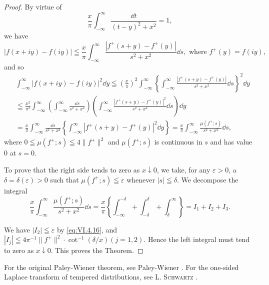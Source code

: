 \begin{proof}
By virtue of 
\begin{equation}\label{eq:VI.4.16}
\frac {x}{\pi} \int_{- \infty} ^{\infty} \frac {\dd t}{(t - y) ^{2} + x ^{2}} = 1,
\end{equation}
we have 
\[
\left| f (x + i y) - f (i y) \right| \leqq \frac {x}{\pi} \int_{- \infty} ^{\infty} \frac {\left| f ^{+} (s + y) - f ^{+} (y) \right|}{s ^{2} + x ^{2}} \dd s, \text{ where } f ^{+} (y) = f (i y),
\]
and so 
\[
\begin{aligned}
&\int_{- \infty} ^{\infty} | f (x + i y) - f (i y) | ^{2} \dd y  \leqq \left(\frac {x}{\pi}\right) ^{2} \int_{- \infty} ^{\infty} \left\{\int_{- \infty} ^{\infty} \frac {| f ^{+} (s + y) - f ^{+} (y) |}{s ^{2} + x ^{2}} \dd s \right\} ^{2} \dd y \\
&\leqq \frac {x ^{2}}{\pi^{2}} \int_{- \infty} ^{\infty} \left(\int_{- \infty} ^{\infty} \frac {\dd s}{s ^{2} + x ^{2}}\right) \left(\int_{- \infty} ^{\infty} \frac {| f ^{+} (s + y) - f ^{+} (y) | ^{2}}{s ^{2} + x ^{2}} \dd s\right) \dd y \\
&= \frac {x}{\pi} \int_{- \infty} ^{\infty} \frac {\dd s}{s ^{2} + x ^{2}} \left\{\int_{- \infty} ^{\infty} | f ^{+} (s + y) - f ^{+} (y) | ^{2} \dd y \right\} = \frac {x}{\pi} \int_{- \infty} ^{\infty} \frac {\mu (f ^{+} ; s)}{s ^{2} + x ^{2}} \dd s,
\end{aligned}
\]
where $0 \leqq \mu(f^{+}; s) \leqq 4 \|f^{+}\|^{2}$ and $\mu(f^{+}; s)$ is continuous in $s$ and has value $0$ at $s = 0$. 

To prove that the right side tends to zero as $x \downarrow 0$, we take, for any $\varepsilon > 0$, a $\delta = \delta(\varepsilon) > 0$ such that $\mu(f^{+}; s) \leqq \varepsilon$ whenever $|s| \leqq \delta$. We decompose the integral 
\[
\frac {x}{\pi} \int_{- \infty} ^{\infty} \frac {\mu (f ^{+} ; s)}{s ^{2} + x ^{2}} \dd s = \frac {x}{\pi} \left\{\int_{- \infty} ^{- \delta} + \int_{- \delta} ^{\delta} + \int_{\delta} ^{\infty} \right\} = I _{1} + I _{2} + I _{3}.
\]

We have $|I_2| \leqq \varepsilon$ by \eqref{eq:VI.4.16}, and $|I_j| \leqq 4\pi^{-1} \|f^+ \|^2 \cdot \cot^{-1}(\delta/x) (j = 1, 2)$. Hence the left integral must tend to zero as $x \downarrow 0$. This proves the Theorem.
\end{proof}

\begin{remarkn}[Remark $1$] For the original Paley-Wiener theorem, see Paley-Wiener \cite{paley243}. For the one-sided Laplace transform of tempered distributions, see L. \textsc{Schwartz} \cite{schwartz295}. 
\end{remarkn}

